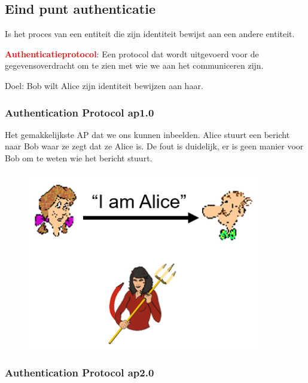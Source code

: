 \subsection{Eind punt authenticatie}
Is het proces van een entiteit die zijn identiteit bewijst aan een andere entiteit.

\noindent \textcolor{red}{\textbf{Authenticatieprotocol}}: Een protocol dat wordt uitgevoerd voor de gegevensoverdracht om te zien met wie we aan het communiceren zijn.

\noindent Doel: Bob wilt Alice zijn identiteit bewijzen aan haar. 
\subsubsection{Authentication Protocol ap1.0}

Het gemakkelijkste AP dat we ons kunnen inbeelden. Alice stuurt een bericht naar Bob waar ze zegt dat ze Alice is.
De fout is duidelijk, er is geen manier voor Bob om te weten wie het bericht stuurt.


\begin{figure}[h]
    \centering
    \includegraphics[width=4in]{./img/imghfdst8/hfdst8puntje13.png}
    \caption{ }      
    \label{fig: }
\end{figure}

\subsubsection{Authentication Protocol ap2.0}


